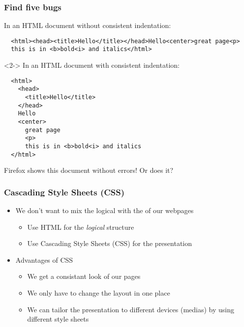 \documentclass[dvipsnames]{beamer}
\begin{document}
\begin{frame}[fragile]
\frametitle{Find five bugs}

In an HTML document without consistent indentation:
\begin{footnotesize}
\begin{verbatim}
  <html><head><title>Hello</title></head>Hello<center>great page<p>
  this is in <b>bold<i> and italics</html>
\end{verbatim}
\end{footnotesize}
\begin{uncoverenv}<2->
  In an HTML document with consistent indentation:
  \begin{footnotesize}
\begin{verbatim}
  <html>
    <head>
      <title>Hello</title>
    </head>
    Hello
    <center>
      great page
      <p>
      this is in <b>bold<i> and italics
  </html>
\end{verbatim}
  \end{footnotesize}
  Firefox shows this document without errors! Or does it?
\end{uncoverenv}
\end{frame}


\begin{frame}
  \frametitle{Cascading Style Sheets (CSS)}
  
  \begin{itemize}
  \item We don't want to mix the logical  with the
     of our webpages
    \begin{itemize}
    \item Use HTML for the \emph{logical} structure
    \item Use Cascading Style Sheets (CSS) for the presentation
    \end{itemize}
  \item Advantages of CSS
    \begin{itemize}
    \item We get a consistant look of our pages
    \item We only have to change the layout in one place
    \item We can tailor the presentation to different devices (medias)
      by using different style sheets
    \end{itemize}
\end{itemize}
  
\end{frame}
\end{document}
